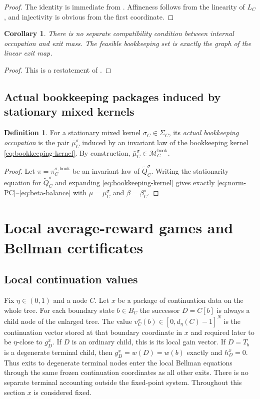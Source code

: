 \documentclass[12pt]{article}
\newtheorem{corollary}[theorem]{Corollary}
\theoremstyle{definition}
\newtheorem{definition}[theorem]{Definition}
\newcommand{\1}{\mathbf{1}}
\newcommand{\cM}{\mathcal{M}}
\begin{document}
\begin{proof}
The identity is immediate from . Affineness follows from the
linearity of $L_C$, and injectivity is obvious from the first coordinate.
\end{proof}

\begin{corollary}
\label{cor:no-vp3}
There is no separate compatibility condition between internal occupation and exit
mass. The feasible bookkeeping set is exactly the graph of the linear exit map.
\end{corollary}

\begin{proof}
This is a restatement of .
\end{proof}

\subsection{Actual bookkeeping packages induced by stationary mixed kernels}

\begin{definition}
\label{def:actual-local-package}
For a stationary mixed kernel $\sigma_C\in\Sigma_C$, its \emph{actual bookkeeping
occupation} is the pair $\bar\mu_C^{\sigma}$ induced by an invariant law of the
bookkeeping kernel \eqref{eq:bookkeeping-kernel}. By construction,
$\bar\mu_C^{\sigma}\in \cM_C^{\mathrm{book}}$.
\end{definition}

\begin{proof}
Let $\pi=\pi_C^{\sigma,\mathrm{book}}$ be an invariant law of
$\widetilde Q_C^{\sigma}$. Writing the stationarity equation for
$\widetilde Q_C^{\sigma}$ and expanding \eqref{eq:bookkeeping-kernel} gives
exactly \eqref{eq:norm-PC}--\eqref{eq:beta-balance} with
$\mu=\mu_C^{\sigma}$ and $\beta=\beta_C^{\sigma}$.
\end{proof}

\section{Local average-reward games and Bellman certificates}
\label{sec:local}

\subsection{Local continuation values}

Fix $\eta\in(0,1)$ and a node $C$. Let $x$ be a package of continuation data on the
whole tree. For each boundary state $b\in B_C$ the successor $D=C[b]$ is always a
child node of the enlarged tree. The value
$v_C^x(b)\in[0,d_\eta(C)-1]^N$ is the continuation vector stored at that boundary
coordinate in $x$ and required later to be $\eta$-close to $g_D^x$. If $D$ is an
ordinary child, this is its local gain vector. If $D=T_b$ is a degenerate
terminal child, then $g_D^x=w(D)=w(b)$ exactly and $h_D^x=0$. Thus exits to
degenerate terminal nodes enter the local Bellman equations through the same
frozen continuation coordinates as all other exits. There is no separate
terminal accounting outside the fixed-point system. Throughout this section $x$
is considered fixed.
\end{document}
